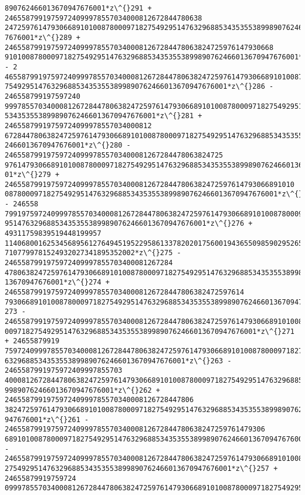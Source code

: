 \documentclass[11pt]{article}
\begin{document}
\begin{tcolorbox}[breakable, size=fbox, boxrule=.5pt, pad at break*=1mm, opacityfill=0]
\begin{Verbatim}[commandchars=\\\{\}]
890762466013670947676001*z\^{}291 + 24655879919759724099978557034000812672844780638
24725976147930668910100878000971827549295147632968853435355389989076246601367094
7676001*z\^{}289 + 2465587991975972409997855703400081267284478063824725976147930668
9101008780009718275492951476329688534353553899890762466013670947676001*z\^{}287 - 2
46558799197597240999785570340008126728447806382472597614793066891010087800097182
75492951476329688534353553899890762466013670947676001*z\^{}286 - 246558799197597240
99978557034000812672844780638247259761479306689101008780009718275492951476329688
534353553899890762466013670947676001*z\^{}281 + 24655879919759724099978557034000812
67284478063824725976147930668910100878000971827549295147632968853435355389989076
2466013670947676001*z\^{}280 - 2465587991975972409997855703400081267284478063824725
97614793066891010087800097182754929514763296885343535538998907624660136709476760
01*z\^{}279 + 246558799197597240999785570340008126728447806382472597614793066891010
08780009718275492951476329688534353553899890762466013670947676001*z\^{}278 - 246558
79919759724099978557034000812672844780638247259761479306689101008780009718275492
951476329688534353553899890762466013670947676001*z\^{}276 + 49311759839519448199957
11406800162534568956127649451952295861337820201756001943655098590295265937706870
7107799781524932027341895352002*z\^{}275 - 2465587991975972409997855703400081267284
47806382472597614793066891010087800097182754929514763296885343535538998907624660
13670947676001*z\^{}274 + 246558799197597240999785570340008126728447806382472597614
79306689101008780009718275492951476329688534353553899890762466013670947676001*z\^{}
273 - 24655879919759724099978557034000812672844780638247259761479306689101008780
009718275492951476329688534353553899890762466013670947676001*z\^{}271 + 24655879919
75972409997855703400081267284478063824725976147930668910100878000971827549295147
6329688534353553899890762466013670947676001*z\^{}263 - 2465587991975972409997855703
40008126728447806382472597614793066891010087800097182754929514763296885343535538
99890762466013670947676001*z\^{}262 + 246558799197597240999785570340008126728447806
38247259761479306689101008780009718275492951476329688534353553899890762466013670
947676001*z\^{}261 - 24655879919759724099978557034000812672844780638247259761479306
689101008780009718275492951476329688534353553899890762466013670947676001*z\^{}259 -
24655879919759724099978557034000812672844780638247259761479306689101008780009718
275492951476329688534353553899890762466013670947676001*z\^{}257 + 24655879919759724
09997855703400081267284478063824725976147930668910100878000971827549295147632968

\end{Verbatim}
\end{tcolorbox}
\end{document}
